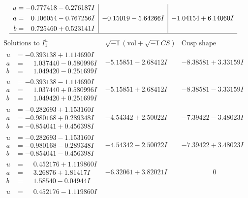 \documentclass[1p]{elsarticle_modified}
\theoremstyle{definition}
\newcommand{\I}{\sqrt{-1}}
\begin{document}
$$\begin{array}{c|c|c}
\begin{aligned}
u &= -0.777418 - 0.276187 I \\
a &= \phantom{-}0.106054 - 0.767256 I \\
b &= \phantom{-}0.725460 + 0.523141 I\end{aligned}
 & -0.15019 - 5.64266 I & -1.04154 + 6.14060 I\\
 \hline 
 \end{array}$$\newpage$$\begin{array}{c|c|c}  
\text{Solutions to }I^u_{1}& \I (\text{vol} + \sqrt{-1}CS) & \text{Cusp shape}\\
 \hline 
\begin{aligned}
u &= -0.393138 + 1.114690 I \\
a &= \phantom{-}1.037440 - 0.580996 I \\
b &= \phantom{-}1.049420 - 0.251699 I\end{aligned}
 & -5.15851 - 2.68412 I & -8.38581 + 3.33159 I \\ \hline\begin{aligned}
u &= -0.393138 - 1.114690 I \\
a &= \phantom{-}1.037440 + 0.580996 I \\
b &= \phantom{-}1.049420 + 0.251699 I\end{aligned}
 & -5.15851 + 2.68412 I & -8.38581 - 3.33159 I \\ \hline\begin{aligned}
u &= -0.282693 + 1.153160 I \\
a &= -0.980168 + 0.289348 I \\
b &= -0.854041 + 0.456398 I\end{aligned}
 & -4.54342 + 2.50022 I & -7.39422 - 3.48023 I \\ \hline\begin{aligned}
u &= -0.282693 - 1.153160 I \\
a &= -0.980168 - 0.289348 I \\
b &= -0.854041 - 0.456398 I\end{aligned}
 & -4.54342 - 2.50022 I & -7.39422 + 3.48023 I \\ \hline\begin{aligned}
u &= \phantom{-}0.452176 + 1.119860 I \\
a &= \phantom{-}3.26876 + 1.81417 I \\
b &= \phantom{-}1.58540 - 0.04944 I\end{aligned}
 & -6.32061 + 3.82021 I & \phantom{-0.000000 } 0 \\ \hline\begin{aligned}
u &= \phantom{-}0.452176 - 1.119860 I \\

\end{aligned}
\end{array}$$
\end{document}
